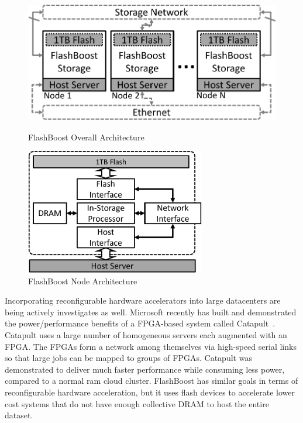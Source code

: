\begin{figure}[t!]
\centering
\vspace{0pt}
\begin{minipage}[c]{.4\paperwidth}
\begin{center}
	\includegraphics[width=\textwidth]{figures/architecture_small-crop.pdf}
	\caption{FlashBoost Overall Architecture}
	\label{fig:architecture}
\end{center}
\end{minipage}\hfill
\vspace{0pt}
\begin{minipage}[c]{.4\paperwidth}
\begin{center}
	\includegraphics[width=0.7\textwidth]{figures/architecture_node-crop.pdf}
	\caption{FlashBoost Node Architecture}
	\label{fig:architecture_node}
\end{center}
\end{minipage}
\end{figure}



Incorporating reconfigurable hardware accelerators into large datacenters are
being actively investigates as well. Microsoft recently has built and
demonstrated the power/performance benefits of a FPGA-based system called
Catapult~\cite{msr_catapult}.  Catapult uses a large number of homogeneous
servers each augmented with an FPGA.  The FPGAs form a network among themselves
via high-speed serial links so that large jobs can be mapped to groups of FPGAs.
Catapult was demonstrated to deliver much faster performance while consuming
less power, compared to a normal ram cloud cluster. FlashBoost has similar
goals in terms of reconfigurable hardware acceleration, but it uses flash
devices to accelerate lower cost systems that do not have enough collective DRAM
to host the entire dataset.

